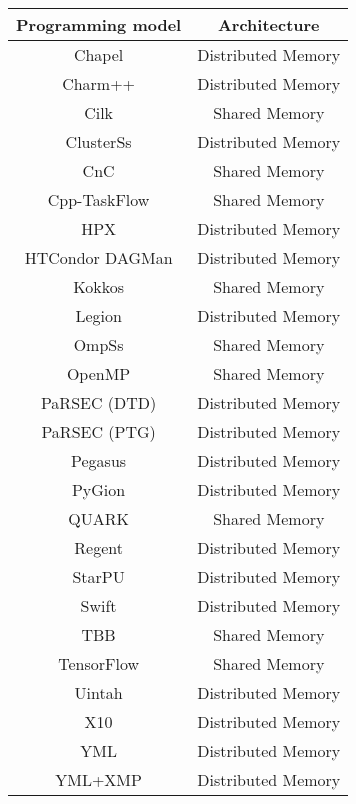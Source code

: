 \begin{tabular}{cc}
\hline
Programming model & Architecture \\
\hline
Chapel & Distributed Memory\\
Charm++ & Distributed Memory\\
Cilk & Shared Memory\\
ClusterSs & Distributed Memory\\
CnC & Shared Memory\\
Cpp-TaskFlow & Shared Memory\\
HPX & Distributed Memory\\
HTCondor DAGMan & Distributed Memory\\
Kokkos & Shared Memory\\
Legion & Distributed Memory\\
OmpSs & Shared Memory\\
OpenMP & Shared Memory\\
PaRSEC (DTD) & Distributed Memory\\
PaRSEC (PTG) & Distributed Memory\\
Pegasus & Distributed Memory\\
PyGion & Distributed Memory\\
QUARK & Shared Memory\\
Regent & Distributed Memory\\
StarPU & Distributed Memory\\
Swift & Distributed Memory\\
TBB & Shared Memory\\
TensorFlow & Shared Memory\\
Uintah & Distributed Memory\\
X10 & Distributed Memory\\
YML & Distributed Memory\\
YML+XMP & Distributed Memory\\
\hline
\end{tabular}
